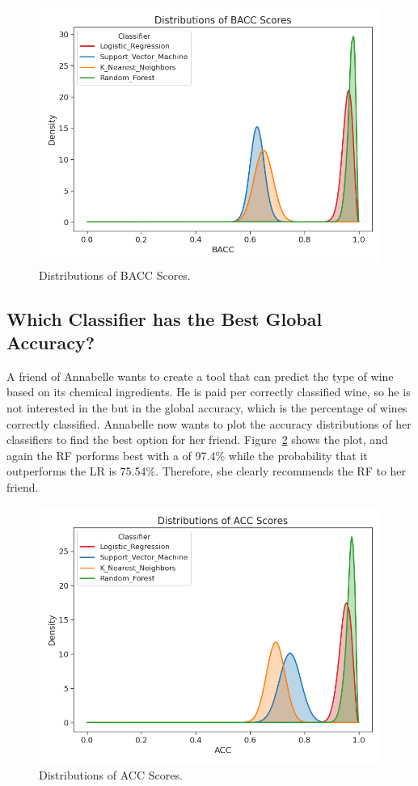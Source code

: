 \documentclass[article]{jss}
\begin{document}
\begin{figure}[t!]
\centering
\includegraphics{plots/figure2.png}
\caption{Distributions of BACC Scores. \label{fig:comparison}}
\end{figure}

\subsection{Which Classifier has the Best Global Accuracy?} \label{sec:ex_global_acc}

A friend of Annabelle wants to create a tool that can predict the type of wine based on its chemical ingredients.
He is paid per correctly classified wine, so he is not interested in the  but in the global accuracy, which is the percentage of wines correctly classified.
Annabelle now wants to plot the accuracy distributions of her classifiers to find the best option for her friend. Figure~\ref{fig:ACCcomparison} shows the plot, and again the RF performs best with a  of 97.4\% while the probability that it outperforms the LR is 75.54\%.
Therefore, she clearly recommends the RF to her friend.

\begin{figure}[t!]
\centering
\includegraphics{plots/figure3.png}
\caption{Distributions of ACC Scores. \label{fig:ACCcomparison}}
\end{figure}
\end{document}
